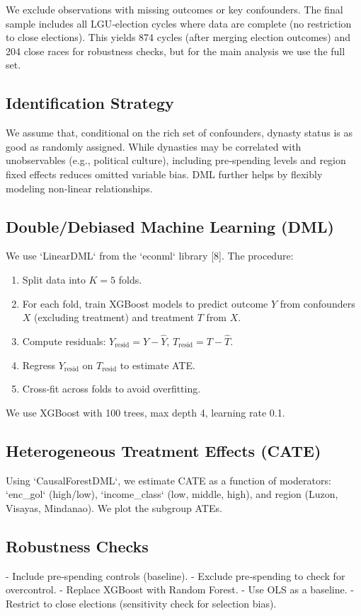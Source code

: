 \documentclass[conference]{IEEEtran}
\begin{document}
We exclude observations with missing outcomes or key confounders. The final sample includes all LGU‑election cycles where data are complete (no restriction to close elections). This yields 874 cycles (after merging election outcomes) and 204 close races for robustness checks, but for the main analysis we use the full set.

\subsection{Identification Strategy}
We assume that, conditional on the rich set of confounders, dynasty status is as good as randomly assigned. While dynasties may be correlated with unobservables (e.g., political culture), including pre‑spending levels and region fixed effects reduces omitted variable bias. DML further helps by flexibly modeling non‑linear relationships.

\subsection{Double/Debiased Machine Learning (DML)}
We use `LinearDML` from the `econml` library [8]. The procedure:
\begin{enumerate}
    \item Split data into $K=5$ folds.
    \item For each fold, train XGBoost models to predict outcome $Y$ from confounders $X$ (excluding treatment) and treatment $T$ from $X$.
    \item Compute residuals: $Y_{\text{resid}} = Y - \hat{Y}$, $T_{\text{resid}} = T - \hat{T}$.
    \item Regress $Y_{\text{resid}}$ on $T_{\text{resid}}$ to estimate ATE.
    \item Cross‑fit across folds to avoid overfitting.
\end{enumerate}
We use XGBoost with 100 trees, max depth 4, learning rate 0.1.

\subsection{Heterogeneous Treatment Effects (CATE)}
Using `CausalForestDML`, we estimate CATE as a function of moderators: `enc_gol` (high/low), `income_class` (low, middle, high), and region (Luzon, Visayas, Mindanao). We plot the subgroup ATEs.

\subsection{Robustness Checks}
- Include pre‑spending controls (baseline).
- Exclude pre‑spending to check for overcontrol.
- Replace XGBoost with Random Forest.
- Use OLS as a baseline.
- Restrict to close elections (sensitivity check for selection bias).
\end{document}
